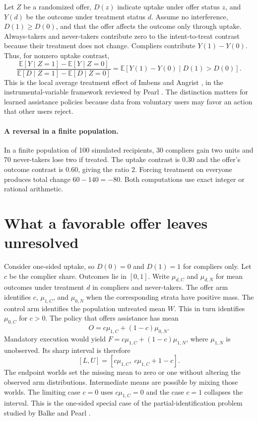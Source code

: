 \documentclass[11pt]{article}
\begin{document}
Let $Z$ be a randomized offer, $D(z)$ indicate uptake under offer status $z$, and $Y(d)$ be the outcome under treatment status $d$. Assume no interference, $D(1)\ge D(0)$, and that the offer affects the outcome only through uptake. Always-takers and never-takers contribute zero to the intent-to-treat contrast because their treatment does not change. Compliers contribute $Y(1)-Y(0)$. Thus, for nonzero uptake contrast,
\[
\frac{\mathbb E[Y\mid Z=1]-\mathbb E[Y\mid Z=0]}
     {\mathbb E[D\mid Z=1]-\mathbb E[D\mid Z=0]}
 =\mathbb E[Y(1)-Y(0)\mid D(1)>D(0)].
\]
This is the local average treatment effect of Imbens and
Angrist \cite{imbens}, in the instrumental-variable framework
reviewed by Pearl \cite{pearl}. The distinction matters for
learned assistance policies because data from voluntary users
may favor an action that other users reject.

\paragraph{A reversal in a finite population.}
In a finite population of 100 simulated recipients, 30 compliers gain two units and 70 never-takers lose two if treated. The uptake contrast is $0.30$ and the offer's outcome contrast is $0.60$, giving the ratio $2$. Forcing treatment on everyone produces total change $60-140=-80$. Both computations use exact integer or rational arithmetic.


\section{What a favorable offer leaves unresolved}
Consider one-sided uptake, so $D(0)=0$ and $D(1)=1$ for compliers
only. Let $c$ be the complier share. Outcomes lie in $[0,1]$.
Write $\mu_{d,C}$ and $\mu_{d,N}$ for mean outcomes under
treatment $d$ in compliers and never-takers. The offer arm
identifies $c$, $\mu_{1,C}$, and $\mu_{0,N}$ when the corresponding
strata have positive mass. The control arm identifies the population
untreated mean $W$. This in turn identifies $\mu_{0,C}$ for $c>0$.
The policy that offers assistance has mean
\[
O=c\mu_{1,C}+(1-c)\mu_{0,N}.
\]
Mandatory execution would yield
$F=c\mu_{1,C}+(1-c)\mu_{1,N}$, where $\mu_{1,N}$ is unobserved.
Its sharp interval is therefore
\[
[L,U]=[c\mu_{1,C},\ c\mu_{1,C}+1-c].
\]
The endpoint worlds set the missing mean to zero or one without
altering the observed arm distributions. Intermediate means are
possible by mixing those worlds. The limiting case $c=0$ uses
$c\mu_{1,C}=0$ and the case $c=1$ collapses the interval.
This is the one-sided special case of the partial-identification
problem studied by Balke and Pearl \cite{balke}.
\end{document}
